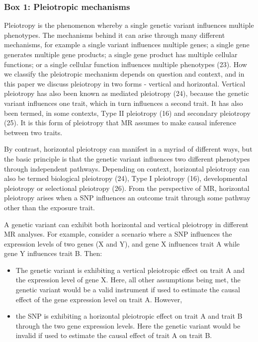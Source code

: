 \documentclass[]{article}
\providecommand{\tightlist}{%
  \setlength{\itemsep}{0pt}\setlength{\parskip}{0pt}}
\begin{document}
\subsubsection{Box 1: Pleiotropic
mechanisms}\label{box-1-pleiotropic-mechanisms}

Pleiotropy is the phenomenon whereby a single genetic variant influences
multiple phenotypes. The mechanisms behind it can arise through many
different mechanisms, for example a single variant influences multiple
genes; a single gene generates multiple gene products; a single gene
product has multiple cellular functions; or a single cellular function
influences multiple phenotypes (23). How we classify the pleiotropic
mechanism depends on question and context, and in this paper we discuss
pleiotropy in two forms - vertical and horizontal. Vertical pleiotropy
has also been known as mediated pleiotropy (24), because the genetic
variant influences one trait, which in turn influences a second trait.
It has also been termed, in some contexts, Type II pleiotropy (16) and
secondary pleiotropy (25). It is this form of pleiotropy that MR assumes
to make causal inference between two traits.

By contrast, horizontal pleiotropy can manifest in a myriad of different
ways, but the basic principle is that the genetic variant influences two
different phenotypes through independent pathways. Depending on context,
horizontal pleiotropy can also be termed biological pleiotropy (24),
Type I pleiotropy (16), developmental pleiotropy or selectional
pleiotropy (26). From the perspective of MR, horizontal pleiotropy
arises when a SNP influences an outcome trait through some pathway other
than the exposure trait.

A genetic variant can exhibit both horizontal and vertical pleiotropy in
different MR analyses. For example, consider a scenario where a SNP
influences the expression levels of two genes (X and Y), and gene X
influences trait A while gene Y influences trait B. Then:

\begin{itemize}
\tightlist
\item
  The genetic variant is exhibiting a vertical pleiotropic effect on
  trait A and the expression level of gene X. Here, all other
  assumptions being met, the genetic variant would be a valid instrument
  if used to estimate the causal effect of the gene expression level on
  trait A. However,
\item
  the SNP is exhibiting a horizontal pleiotropic effect on trait A and
  trait B through the two gene expression levels. Here the genetic
  variant would be invalid if used to estimate the causal effect of
  trait A on trait B.
\end{itemize}
\end{document}
